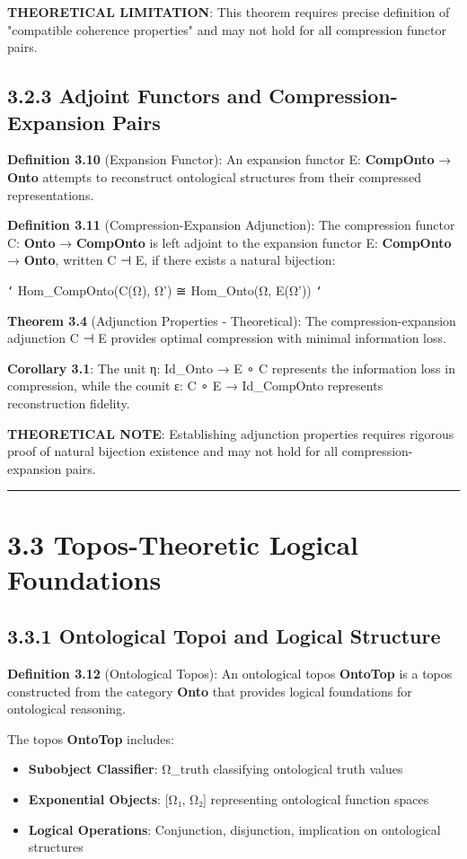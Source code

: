 \textbf{THEORETICAL LIMITATION}: This theorem requires precise definition of "compatible coherence properties" and may not hold for all compression functor pairs.

\subsection{3.2.3 Adjoint Functors and Compression-Expansion Pairs}

\textbf{Definition 3.10} (Expansion Functor): An expansion functor E: \textbf{CompOnto} → \textbf{Onto} attempts to reconstruct ontological structures from their compressed representations.

\textbf{Definition 3.11} (Compression-Expansion Adjunction): The compression functor C: \textbf{Onto} → \textbf{CompOnto} is left adjoint to the expansion functor E: \textbf{CompOnto} → \textbf{Onto}, written C ⊣ E, if there exists a natural bijection:

\texttt{`}
Hom_{CompOnto}(C(Ω), Ω') ≅ Hom_{Onto}(Ω, E(Ω'))
\texttt{`}

\textbf{Theorem 3.4} (Adjunction Properties - Theoretical): The compression-expansion adjunction C ⊣ E provides optimal compression with minimal information loss.

\textbf{Corollary 3.1}: The unit η: Id_{Onto} → E ∘ C represents the information loss in compression, while the counit ε: C ∘ E → Id_{CompOnto} represents reconstruction fidelity.

\textbf{THEORETICAL NOTE}: Establishing adjunction properties requires rigorous proof of natural bijection existence and may not hold for all compression-expansion pairs.

\hrule

\section{3.3 Topos-Theoretic Logical Foundations}

\subsection{3.3.1 Ontological Topoi and Logical Structure}

\textbf{Definition 3.12} (Ontological Topos): An ontological topos \textbf{OntoTop} is a topos constructed from the category \textbf{Onto} that provides logical foundations for ontological reasoning.

The topos \textbf{OntoTop} includes:
\begin{itemize}
\item \textbf{Subobject Classifier}: Ω_truth classifying ontological truth values
\item \textbf{Exponential Objects}: [Ω₁, Ω₂] representing ontological function spaces
\item \textbf{Logical Operations}: Conjunction, disjunction, implication on ontological structures
\end{itemize}

